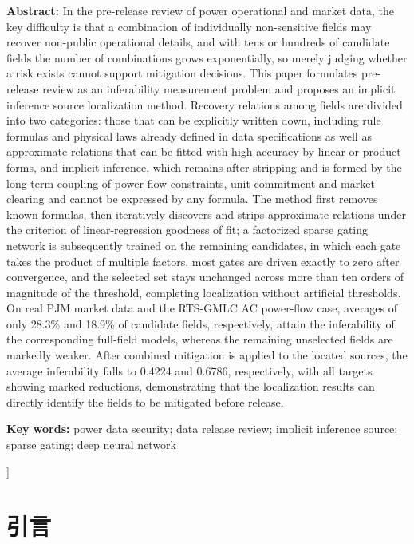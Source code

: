\documentclass[UTF8,zihao=5,twoside]{ctexart}
\begin{document}
\noindent\textbf{Abstract:} In the pre-release review of power operational and market data, the key difficulty is that a combination of individually non-sensitive fields may recover non-public operational details, and with tens or hundreds of candidate fields the number of combinations grows exponentially, so merely judging whether a risk exists cannot support mitigation decisions. This paper formulates pre-release review as an inferability measurement problem and proposes an implicit inference source localization method. Recovery relations among fields are divided into two categories: those that can be explicitly written down, including rule formulas and physical laws already defined in data specifications as well as approximate relations that can be fitted with high accuracy by linear or product forms, and implicit inference, which remains after stripping and is formed by the long-term coupling of power-flow constraints, unit commitment and market clearing and cannot be expressed by any formula. The method first removes known formulas, then iteratively discovers and strips approximate relations under the criterion of linear-regression goodness of fit; a factorized sparse gating network is subsequently trained on the remaining candidates, in which each gate takes the product of multiple factors, most gates are driven exactly to zero after convergence, and the selected set stays unchanged across more than ten orders of magnitude of the threshold, completing localization without artificial thresholds. On real PJM market data and the RTS-GMLC AC power-flow case, averages of only 28.3\% and 18.9\% of candidate fields, respectively, attain the inferability of the corresponding full-field models, whereas the remaining unselected fields are markedly weaker. After combined mitigation is applied to the located sources, the average inferability falls to 0.4224 and 0.6786, respectively, with all targets showing marked reductions, demonstrating that the localization results can directly identify the fields to be mitigated before release.\par
\noindent\textbf{Key words:} power data security; data release review; implicit inference source; sparse gating; deep neural network\par\vspace{0.8em}

\vspace{0.8em}
]

\section{引言}
\end{document}
